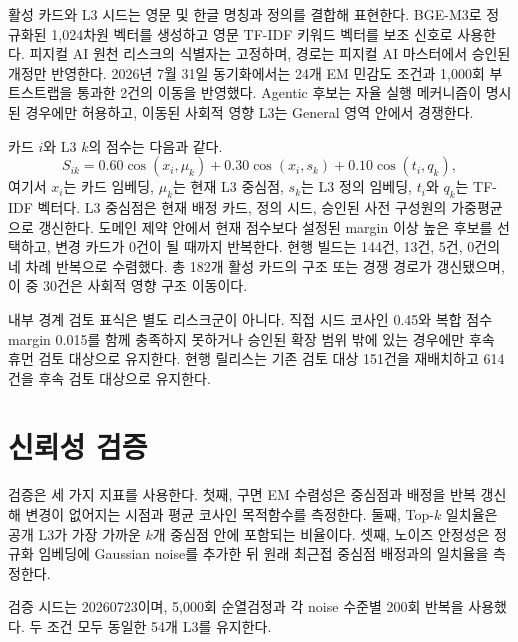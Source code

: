 \documentclass[11pt,a4paper]{article}
\begin{document}
활성 카드와 L3 시드는 영문 및 한글 명칭과 정의를 결합해 표현한다. BGE-M3로
정규화된 1,024차원 벡터를 생성하고 영문 TF-IDF 키워드 벡터를 보조 신호로
사용한다. 피지컬 AI 원천 리스크의 식별자는 고정하며, 경로는 피지컬 AI
마스터에서 승인된 개정만 반영한다. 2026년 7월 31일 동기화에서는 24개 EM
민감도 조건과 1,000회 부트스트랩을 통과한 2건의 이동을 반영했다.
Agentic 후보는 자율 실행 메커니즘이 명시된 경우에만 허용하고, 이동된 사회적
영향 L3는 General 영역 안에서 경쟁한다.

카드 $i$와 L3 $k$의 점수는 다음과 같다.
\begin{equation}
S_{ik}
=0.60\cos(x_i,\mu_k)
+0.30\cos(x_i,s_k)
+0.10\cos(t_i,q_k),
\end{equation}
여기서 $x_i$는 카드 임베딩, $\mu_k$는 현재 L3 중심점, $s_k$는 L3 정의
임베딩, $t_i$와 $q_k$는 TF-IDF 벡터다. L3 중심점은 현재 배정 카드, 정의 시드,
승인된 사전 구성원의 가중평균으로 갱신한다. 도메인 제약 안에서 현재 점수보다
설정된 margin 이상 높은 후보를 선택하고, 변경 카드가 0건이 될 때까지 반복한다.
현행 빌드는 144건, 13건, 5건, 0건의 네 차례 반복으로 수렴했다. 총 182개 활성
카드의 구조 또는 경쟁 경로가 갱신됐으며, 이 중 30건은 사회적 영향 구조 이동이다.

내부 경계 검토 표식은 별도 리스크군이 아니다. 직접 시드 코사인 0.45와 복합
점수 margin 0.015를 함께 충족하지 못하거나 승인된 확장 범위 밖에 있는 경우에만
후속 휴먼 검토 대상으로 유지한다. 현행 릴리스는 기존 검토 대상 151건을
재배치하고 614건을 후속 검토 대상으로 유지한다.

\section{신뢰성 검증}

검증은 세 가지 지표를 사용한다. 첫째, 구면 EM 수렴성은 중심점과 배정을
반복 갱신해 변경이 없어지는 시점과 평균 코사인 목적함수를 측정한다. 둘째,
Top-$k$ 일치율은 공개 L3가 가장 가까운 $k$개 중심점 안에 포함되는 비율이다.
셋째, 노이즈 안정성은 정규화 임베딩에 Gaussian noise를 추가한 뒤 원래
최근접 중심점 배정과의 일치율을 측정한다.

검증 시드는 20260723이며, 5,000회 순열검정과 각 noise 수준별 200회 반복을
사용했다. 두 조건 모두 동일한 54개 L3를 유지한다.
\end{document}
